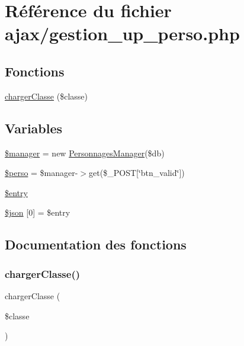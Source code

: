 \hypertarget{gestion__up__perso_8php}{}\section{Référence du fichier ajax/gestion\+\_\+up\+\_\+perso.php}
\label{gestion__up__perso_8php}
\subsection*{Fonctions}
\begin{DoxyCompactItemize}
\item 
\mbox{\hyperlink{gestion__up__perso_8php_a6bdbbd60a21fa5e8c1db3f7596a47013}{charger\+Classe}} (\$classe)
\end{DoxyCompactItemize}
\subsection*{Variables}
\begin{DoxyCompactItemize}
\item 
\mbox{\hyperlink{gestion__up__perso_8php_a4621b1cd69b1417c9fb966c825299de1}{\$manager}} = new \mbox{\hyperlink{class_personnages_manager}{Personnages\+Manager}}(\$db)
\item 
\mbox{\hyperlink{gestion__up__perso_8php_a648bcc9981df7cceb4b931a80064a6c5}{\$perso}} = \$manager-\/$>$get(\$\+\_\+\+P\+O\+ST\mbox{[}\char`\"{}btn\+\_\+valid\char`\"{}\mbox{]})
\item 
\mbox{\hyperlink{gestion__up__perso_8php_a5291dff564984cdb59d278ef6c471d80}{\$entry}}
\item 
\mbox{\hyperlink{gestion__up__perso_8php_add07af0ae9e1b5fc6710c22cf96fd24c}{\$json}} \mbox{[}0\mbox{]} = \$entry
\end{DoxyCompactItemize}


\subsection{Documentation des fonctions}
\mbox{\label{gestion__up__perso_8php_a6bdbbd60a21fa5e8c1db3f7596a47013}} 
\subsubsection{\texorpdfstring{charger\+Classe()}{chargerClasse()}}
{\footnotesize\ttfamily charger\+Classe (\begin{DoxyParamCaption}\item[{}]{\$classe }\end{DoxyParamCaption})}



